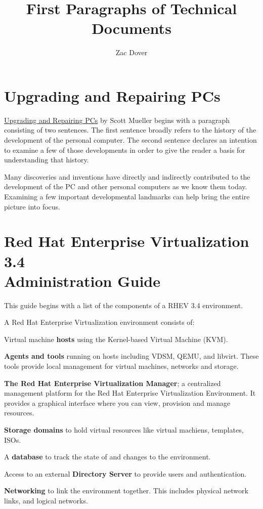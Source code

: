 \documentclass[a4paper,12pt]{article}
\title{First Paragraphs of Technical Documents}
\author{Zac Dover}
\begin{document}
\maketitle

\section{Upgrading and Repairing PCs}
\underline{Upgrading and Repairing PCs} by Scott Mueller begins with a paragraph consisting of two sentences. The first sentence broadly refers to the history of the development of the personal computer. The second sentence declares an intention to examine a few of those developments in order to give the reader a basis for understanding that history.
\begin{displayquote}
Many discoveries and inventions have directly and indirectly contributed to the development of the PC and other personal computers as we know them today. Examining a few important developmental landmarks can help bring the entire picture into focus.
\end{displayquote}

\section{Red Hat Enterprise Virtualization 3.4 \\ Administration Guide}
This guide begins with a list of the components of a RHEV 3.4 environment.
\begin{displayquote}
{\tiny A Red Hat Enterprise Virtualization environment consists of:}
\begin{itemize}
{\tiny  \item Virtual machine \textbf{hosts} using the Kernel-based Virtual Machine (KVM).}
{\tiny  \item \textbf{Agents and tools} running on hosts including VDSM, QEMU, and libvirt. These tools provide local management for virtual machines, networks and storage.}
{\tiny  \item \textbf{The Red Hat Enterprise Virtualization Manager}; a centralized management platform for the Red Hat Enterprise Virtualization Environment. It provides a graphical interface where you can view, provision and manage resources.}
{\tiny  \item \textbf{Storage domains} to hold virtual resources like virtual machiens, templates, ISOs.}
{\tiny  \item A \textbf{database} to track the state of and changes to the environment.}
{\tiny  \item Access to an external \textbf{Directory Server} to provide users and authentication.}
{\tiny  \item \textbf{Networking} to link the environment together. This includes physical network links, and logical networks.}
\end{itemize}
\end{displayquote}
\end{document}
